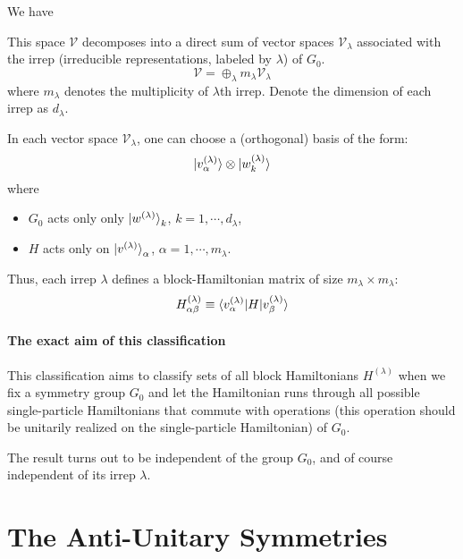 \documentclass{article}
\begin{document}
We have
\begin{thm}
This space $\mathcal{V}$ decomposes into a direct sum of vector spaces
$\mathcal{V}_\lambda$ associated with the irrep (irreducible
representations, labeled by $\lambda$) of $G_0$.
\begin{equation}
    \mathcal{V} = \oplus_\lambda m_\lambda \mathcal{V}_\lambda
\end{equation}
where $m_\lambda$ denotes the multiplicity of $\lambda$th irrep.
Denote the dimension of each irrep as $d_\lambda$.

In each vector space $\mathcal{V}_\lambda$, one can choose a
(orthogonal) basis of the form:
\begin{equation}
    \ket{v^{(\lambda)}_\alpha} \otimes \ket{w^{(\lambda)}_k}
\end{equation}
where
\begin{itemize}
    \item $G_0$ acts only only $\ket{w^{(\lambda)}}_k$,
        $k=1,\cdots,d_\lambda$,
    \item $H$ acts only on $\ket{v^{(\lambda)}}_\alpha$,
        $\alpha=1,\cdots,m_\lambda$.
\end{itemize}
\end{thm}

Thus, each irrep $\lambda$ defines a block-Hamiltonian matrix of size
$m_\lambda\times m_\lambda$:
\begin{equation}
    H^{(\lambda)}_{\alpha\beta} \equiv 
    \braket{v^{(\lambda)}_\alpha | H | v^{(\lambda)}_\beta}
\end{equation}

\paragraph{The exact aim of this classification}
This classification aims to classify sets of all block Hamiltonians
$H^{(\lambda)}$ when we fix a symmetry group $G_0$ and let the
Hamiltonian runs through all possible single-particle Hamiltonians
that commute with operations (this operation should be unitarily
realized on the single-particle Hamiltonian) of $G_0$.

The result turns out to be independent of the group $G_0$, and of
course independent of its irrep $\lambda$.

\section{The Anti-Unitary Symmetries}
\label{sec:The Anti-Unitary Symmetries}
\end{document}
